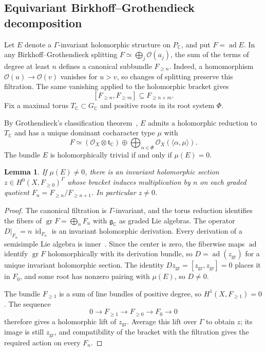 \documentclass[11pt,a4paper,reqno]{amsart}
\theoremstyle{plain}
\newtheorem{lemma}[theorem]{Lemma}
\theoremstyle{definition}
\theoremstyle{remark}
\numberwithin{equation}{section}
\DeclareMathOperator{\ad}{ad}
\newcommand{\CC}{\mathbb C}
\newcommand{\cO}{\mathcal O}
\newcommand{\fg}{\mathfrak g}
\newcommand{\ft}{\mathfrak t}
\newcommand{\pair}[2]{\langle #1,#2\rangle}
\DeclareMathOperator{\id}{id}
\begin{document}
\subsection{Equivariant Birkhoff--Grothendieck decomposition}

Let $E$ denote a $\Gamma$-invariant holomorphic structure on $P_{\CC}$, and put $F=\ad E$. In any Birkhoff--Grothendieck splitting $F\simeq\bigoplus_j\cO(a_j)$, the sum of the terms of degree at least $n$ defines a canonical subbundle $F_{\ge n}$. Indeed, a homomorphism $\cO(u)\to\cO(v)$ vanishes for $u>v$, so changes of splitting preserve this filtration. The same vanishing applied to the holomorphic bracket gives
\[
[F_{\ge n},F_{\ge m}]\subseteq F_{\ge n+m}.
\]
Fix a maximal torus $T_{\CC}\subset G_{\CC}$ and positive roots in its root system $\Phi$.

By Grothendieck's classification theorem~\cite[Th\'eor\`eme~1.1 and Corollaire~2]{Grothendieck}, $E$ admits a holomorphic reduction to $T_{\CC}$ and has a unique dominant cocharacter type $\mu$ with
\[
F\simeq(\cO_X\otimes\ft_{\CC})\oplus\bigoplus_{\alpha\in\Phi}\cO_X(\pair{\alpha}{\mu}).
\]
The bundle $E$ is holomorphically trivial if and only if $\mu(E)=0$.

\begin{lemma}\label{lem:nonzero-type-invariants}
If $\mu(E)\ne0$, there is an invariant holomorphic section $z\in H^0(X,F_{\ge0})^\Gamma$ whose bracket induces multiplication by $n$ on each graded quotient $F_n=F_{\ge n}/F_{\ge n+1}$. In particular $z\ne0$.
\end{lemma}

\begin{proof}
The canonical filtration is $\Gamma$-invariant, and the torus reduction identifies the fibers of $\operatorname{gr}F=\bigoplus_n F_n$ with $\fg_{\CC}$ as graded Lie algebras. The operator $D|_{F_n}=n\,\id_{F_n}$ is an invariant holomorphic derivation. Every derivation of a semisimple Lie algebra is inner~\cite[\S5.3]{HumphreysLie}. Since the center is zero, the fiberwise maps $\ad$ identify $\operatorname{gr}F$ holomorphically with its derivation bundle, so $D=\ad(z_{\mathrm{gr}})$ for a unique invariant holomorphic section. The identity $Dz_{\mathrm{gr}}=[z_{\mathrm{gr}},z_{\mathrm{gr}}]=0$ places it in $F_0$, and some root has nonzero pairing with $\mu(E)$, so $D\ne0$.

The bundle $F_{\ge1}$ is a sum of line bundles of positive degree, so $H^1(X,F_{\ge1})=0$. The sequence
\[
0\longrightarrow F_{\ge1}\longrightarrow F_{\ge0}\longrightarrow F_0\longrightarrow0
\]
therefore gives a holomorphic lift of $z_{\mathrm{gr}}$. Average this lift over $\Gamma$ to obtain $z$; its image is still $z_{\mathrm{gr}}$, and compatibility of the bracket with the filtration gives the required action on every $F_n$.
\end{proof}
\end{document}
